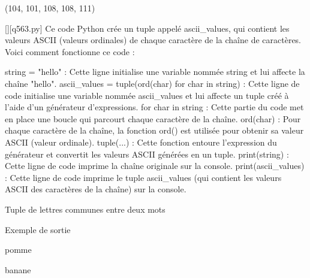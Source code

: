 (104, 101, 108, 108, 111)
        \par
        \begin{solution}
            \renewcommand{\nomfichier}{q563.py}
            \pythonfile{\chemincode \nomfichier}[][\nomfichier]
            Ce code Python crée un tuple appelé ascii_values, qui contient les valeurs ASCII (valeurs ordinales) de chaque caractère de la chaîne de caractères. Voici comment fonctionne ce code :

    string = "hello" : Cette ligne initialise une variable nommée string et lui affecte la chaîne "hello".
    ascii_values = tuple(ord(char) for char in string) : Cette ligne de code initialise une variable nommée ascii_values et lui affecte un tuple créé à l'aide d'un générateur d'expressions.
        for char in string : Cette partie du code met en place une boucle qui parcourt chaque caractère de la chaîne.
        ord(char) : Pour chaque caractère de la chaîne, la fonction ord() est utilisée pour obtenir sa valeur ASCII (valeur ordinale).
        tuple(...) : Cette fonction entoure l'expression du générateur et convertit les valeurs ASCII générées en un tuple.
    print(string) : Cette ligne de code imprime la chaîne originale sur la console.
    print(ascii_values) : Cette ligne de code imprime le tuple ascii_values (qui contient les valeurs ASCII des caractères de la chaîne) sur la console.
        \end{solution}
        

        \question
        Tuple de lettres communes entre deux mots

Exemple de sortie

pomme

banane

